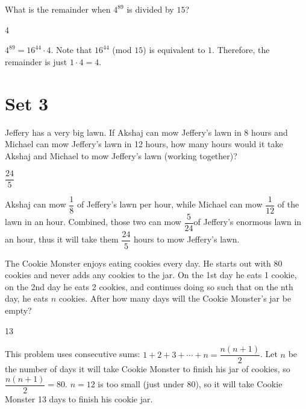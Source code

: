 \documentclass[11pt]{article}
\begin{document}
\begin{problem}%
What is the remainder when $4^{89}$ is divided by $15$?
\end{problem}

\begin{answer}
4
\end{answer}

\begin{solution}
$4^{89} = 16^{44}\cdot 4$. Note that $16^{44}$ (mod $15$) is equivalent to $1$. Therefore, the remainder is just $1\cdot4 = 4$.
\end{solution}

\newpage

\section*{Set 3}

\begin{problem}%
Jeffery has a very big lawn. If Akshaj can mow Jeffery's lawn in 8 hours and Michael can mow Jeffery's lawn in 12 hours, how many hours would it take Akshaj and Michael to mow Jeffery's lawn (working together)?
\end{problem}

\begin{answer}
$\dfrac{24}{5}$
\end{answer}

\begin{solution}
Akshaj can mow $\dfrac{1}{8}$ of Jeffery's lawn per hour, while Michael can mow $\dfrac{1}{12}$ of the lawn in an hour. Combined, those two can mow $\dfrac{5}{24}$of Jeffery's enormous lawn in an hour, thus it will take them $\dfrac{24}{5}$ hours to mow Jeffery's lawn.
\end{solution}


\begin{problem}%
The Cookie Monster enjoys eating cookies every day. He starts out with 80 cookies and never adds any cookies to the jar. On the 1st day he eats 1 cookie, on the 2nd day he eats 2 cookies, and continues doing so such that on the nth day, he eats $n$ cookies. After how many days will the Cookie Monster's jar be empty? 
\end{problem}

\begin{answer}
13
\end{answer}

\begin{solution}
This problem uses consecutive sums: $1+2+3+ \cdots +n = \dfrac{n(n+1)}{2}$. Let $n$ be the number of days it will take Cookie Monster to finish his jar of cookies, so $\dfrac{n(n+1)}{2} = 80$. $n = 12$ is too small (just under 80), so it will take Cookie Monster 13 days to finish his cookie jar.
\end{solution}
\end{document}
